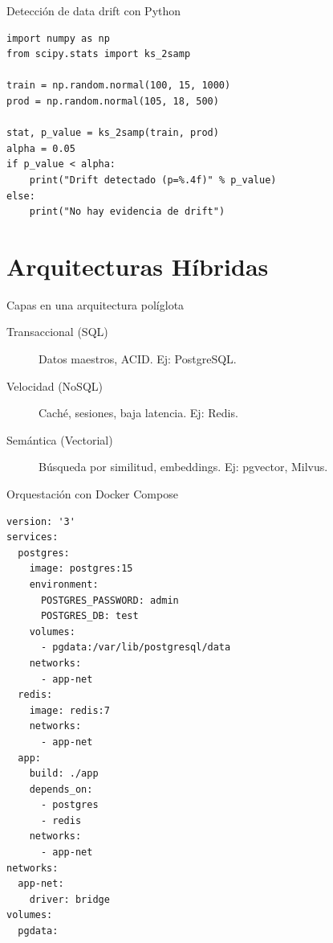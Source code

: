 \documentclass[aspectratio=169, 10pt, xcolor=table]{beamer}
\begin{document}
\begin{frame}[fragile]{Detección de data drift con Python}
    \begin{lstlisting}[style=pythonstyle]
import numpy as np
from scipy.stats import ks_2samp

train = np.random.normal(100, 15, 1000)
prod = np.random.normal(105, 18, 500)

stat, p_value = ks_2samp(train, prod)
alpha = 0.05
if p_value < alpha:
    print("Drift detectado (p=%.4f)" % p_value)
else:
    print("No hay evidencia de drift")
    \end{lstlisting}
\end{frame}

\section{Arquitecturas Híbridas}

\begin{frame}{Capas en una arquitectura políglota}
    \begin{description}
        \item[Transaccional (SQL)] Datos maestros, ACID. Ej: PostgreSQL.
        \item[Velocidad (NoSQL)] Caché, sesiones, baja latencia. Ej: Redis.
        \item[Semántica (Vectorial)] Búsqueda por similitud, embeddings. Ej: pgvector, Milvus.
    \end{description}
\end{frame}

\begin{frame}[fragile]{Orquestación con Docker Compose}
    \begin{lstlisting}[style=yamlstyle]
version: '3'
services:
  postgres:
    image: postgres:15
    environment:
      POSTGRES_PASSWORD: admin
      POSTGRES_DB: test
    volumes:
      - pgdata:/var/lib/postgresql/data
    networks:
      - app-net
  redis:
    image: redis:7
    networks:
      - app-net
  app:
    build: ./app
    depends_on:
      - postgres
      - redis
    networks:
      - app-net
networks:
  app-net:
    driver: bridge
volumes:
  pgdata:
    \end{lstlisting}
\end{frame}
\end{document}
